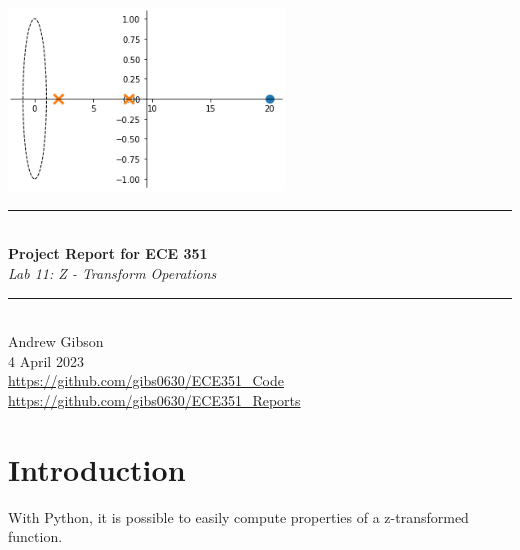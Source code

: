 \documentclass[12pt,a4paper]{article}
\newcommand{\HRule}{\rule{\linewidth}{0.5mm}}
\begin{document}
\begin{titlepage}
\begin{center}
\includegraphics[width=0.55\textwidth]{titlepage_image.png}~\\[2cm]
\HRule \\[0.4cm]
{ \LARGE 
  \textbf{Project Report for ECE 351}\\[0.4cm]
  \emph{Lab 11: Z - Transform Operations}\\[0.4cm]
}
\HRule \\[1.5cm]
{ \large
  Andrew Gibson \\[0.1cm]
 4 April 2023\\[0.1cm]
  \url{https://github.com/gibs0630/ECE351\_Code}\\[0.1cm]
  \url{https://github.com/gibs0630/ECE351\_Reports}\\[0.1cm]
}
\vfill
{\large }
 
\end{center}
\end{titlepage}
\newpage
\tableofcontents
{}
\newpage
\setcounter{page}{1}
\section{Introduction}\label{sec:intro}
With Python, it is possible to easily compute properties of a z-transformed  function.
\end{document}
